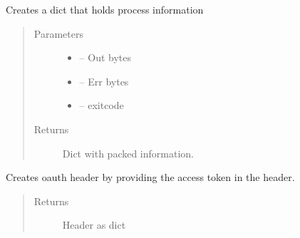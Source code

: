 \documentclass[letterpaper,10pt,english]{sphinxmanual}
\begin{document}

\begin{fulllineitems}
\label{_source/son_editor.impl:son_editor.impl.gitimpl.create_info_dict}
Creates a dict that holds process information
\begin{quote}\begin{description}
\item[{Parameters}] \leavevmode\begin{itemize}
\item {} 
 -- Out bytes

\item {} 
 -- Err bytes

\item {} 
 -- exitcode

\end{itemize}

\item[{Returns}] \leavevmode
Dict with packed information.

\end{description}\end{quote}

\end{fulllineitems}


\begin{fulllineitems}
\label{_source/son_editor.impl:son_editor.impl.gitimpl.create_oauth_header}
Creates oauth header by providing the access token in the header.
\begin{quote}\begin{description}
\item[{Returns}] \leavevmode
Header as dict

\end{description}\end{quote}

\end{fulllineitems}

\end{document}
